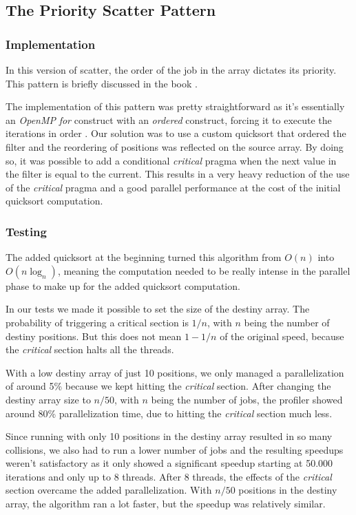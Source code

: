 \documentclass[9pt,journal]{IEEEtran}
\begin{document}
\subsection{The Priority Scatter Pattern}
\subsubsection{Implementation}

In this version of scatter, the order of the job in the array dictates its priority. This pattern is briefly discussed in the book \cite{mccool}. 

The implementation of this pattern was pretty straightforward as it's essentially an \textit{OpenMP} \textit{for} construct with an \textit{ordered} construct, forcing it to execute the iterations in order \cite{omporder}.
Our solution was to use a custom quicksort that ordered the filter and the reordering of positions was reflected on the source array. By doing so, it was possible to add a conditional \textit{critical} pragma when the next value in the filter is equal to the current. This results in a very heavy reduction of the use of the \textit{critical} pragma and a good parallel performance at the cost of the initial quicksort computation.

\subsubsection{Testing}

The added quicksort at the beginning turned this algorithm from $ O(n) $ into $ O(n\log_n) $, meaning the computation needed to be really intense in the parallel phase to make up for the added quicksort computation. 

In our tests we made it possible to set the size of the destiny array. The probability of triggering a critical section is $ 1 / n $, with $ n $ being the number of destiny positions. But this does not mean $ 1 - 1 / n $ of the original speed, because the \textit{critical} section halts all the threads. 

With a low destiny array of just 10 positions, we only managed a parallelization of around 5\% because we kept hitting the \textit{critical} section. After changing the destiny array size to $ n / 50 $, with $ n $ being the number of jobs, the profiler showed around 80\% parallelization time, due to hitting the \textit{critical} section much less.

Since running with only 10 positions in the destiny array resulted in so many collisions, we also had to run a lower number of jobs and the resulting speedups weren't satisfactory as it only showed a significant speedup starting at 50.000 iterations and only up to 8 threads. After 8 threads, the effects of the \textit{critical} section overcame the added parallelization. With $ n / 50 $ positions in the destiny array, the algorithm ran a lot faster, but the speedup was relatively similar. 
\end{document}
